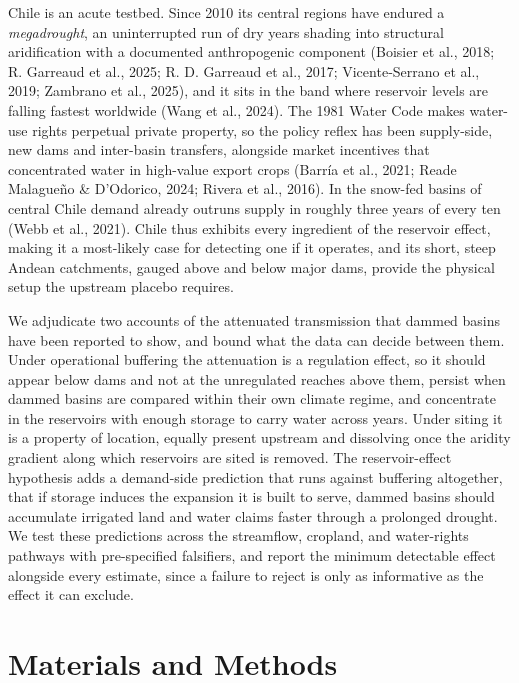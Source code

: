 \documentclass[
]{agujournal2019}
\begin{document}
Chile is an acute testbed. Since 2010 its central regions have endured a
\emph{megadrought}, an uninterrupted run of dry years shading into
structural aridification with a documented anthropogenic component
(Boisier et al., 2018; R. Garreaud et al., 2025; R. D. Garreaud et al.,
2017; Vicente‐Serrano et al., 2019; Zambrano et al., 2025), and it sits
in the band where reservoir levels are falling fastest worldwide (Wang
et al., 2024). The 1981 Water Code makes water-use rights perpetual
private property, so the policy reflex has been supply-side, new dams
and inter-basin transfers, alongside market incentives that concentrated
water in high-value export crops (Barría et al., 2021; Reade Malagueño
\& D'Odorico, 2024; Rivera et al., 2016). In the snow-fed basins of
central Chile demand already outruns supply in roughly three years of
every ten (Webb et al., 2021). Chile thus exhibits every ingredient of
the reservoir effect, making it a most-likely case for detecting one if
it operates, and its short, steep Andean catchments, gauged above and
below major dams, provide the physical setup the upstream placebo
requires.

We adjudicate two accounts of the attenuated transmission that dammed
basins have been reported to show, and bound what the data can decide
between them. Under operational buffering the attenuation is a
regulation effect, so it should appear below dams and not at the
unregulated reaches above them, persist when dammed basins are compared
within their own climate regime, and concentrate in the reservoirs with
enough storage to carry water across years. Under siting it is a
property of location, equally present upstream and dissolving once the
aridity gradient along which reservoirs are sited is removed. The
reservoir-effect hypothesis adds a demand-side prediction that runs
against buffering altogether, that if storage induces the expansion it
is built to serve, dammed basins should accumulate irrigated land and
water claims faster through a prolonged drought. We test these
predictions across the streamflow, cropland, and water-rights pathways
with pre-specified falsifiers, and report the minimum detectable effect
alongside every estimate, since a failure to reject is only as
informative as the effect it can exclude.

\section{Materials and Methods}\label{materials-and-methods}
\end{document}
